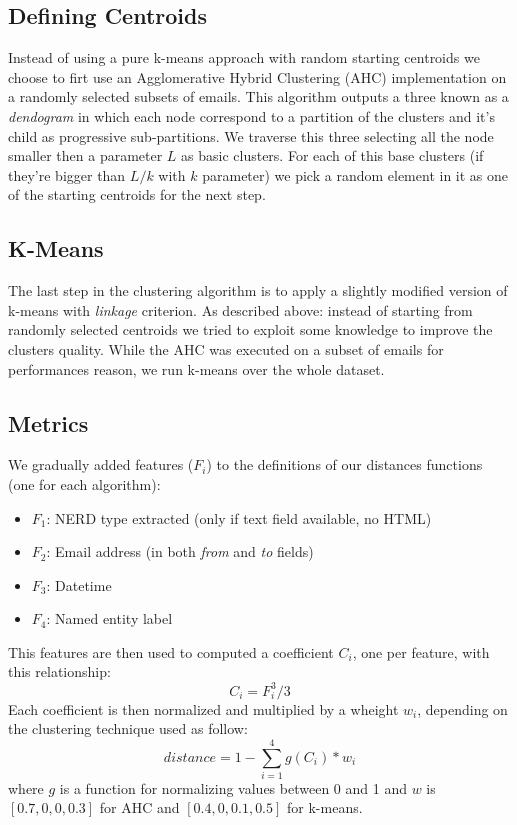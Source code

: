 \documentclass[a4paper,12pt]{report}
\begin{document}
\subsection{Defining Centroids}
Instead of using a pure k-means approach with random starting centroids we choose to firt use an Agglomerative Hybrid Clustering (AHC) implementation on a randomly selected subsets of emails. This algorithm outputs a three known as a \emph{dendogram} in which each node correspond to a partition of the clusters and it's child as progressive sub-partitions. We traverse this three selecting all the node smaller then a parameter $L$ as basic clusters.
For each of this base clusters (if they're bigger than $L/k$ with $k$ parameter) we pick a random element in it as one of the starting centroids for the next step.

\subsection{K-Means}
The last step in the clustering algorithm is to apply a slightly modified version of k-means with \emph{linkage} criterion. As described above: instead of starting from randomly selected centroids we tried to exploit some knowledge to improve the clusters quality. While the AHC was executed on a subset of emails for performances reason, we run k-means over the whole dataset.

\subsection{Metrics}
We gradually added features ($F_{i}$) to the definitions of our distances functions (one for each algorithm):
\begin{itemize}
\item $F_{1}$: NERD type extracted (only if text field available, no HTML)
\item $F_{2}$: Email address (in both \emph{from} and \emph{to} fields)
\item $F_{3}$: Datetime 
\item $F_{4}$: Named entity label
\end{itemize}

This features are then used to computed a coefficient $C_{i}$, one per feature, with this relationship:
\[C_{i} = F_{i}^3 / 3 \]
Each coefficient is then normalized and multiplied by a wheight $w_{i}$, depending on the clustering technique used as follow:
\[distance = 1 - \sum_{i=1}^{4} g(C_i)*w_i \]
where $g$ is a function for normalizing values between 0 and 1 and $w$ is $[0.7, 0, 0, 0.3]$ for AHC and $[0.4, 0, 0.1, 0.5]$ for k-means.
\end{document}
